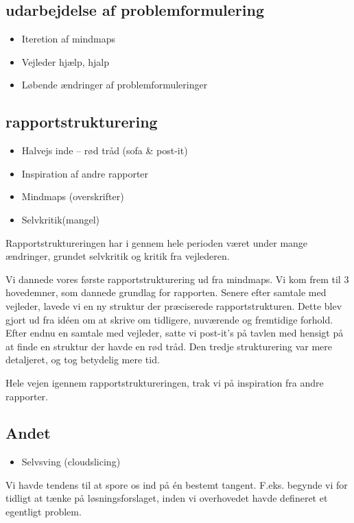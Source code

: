 \subsection{udarbejdelse af problemformulering}
\begin{itemize}
\item Iteretion af mindmaps
\item Vejleder hjælp, hjalp
\item Løbende ændringer af problemformuleringer

\end{itemize}

\subsection{rapportstrukturering}
\begin{itemize}
\item Halvejs inde – rød tråd (sofa \& post-it)
\item Inspiration af andre rapporter
\item Mindmaps (overskrifter)
\item Selvkritik(mangel)
\end{itemize}

Rapportstruktureringen har i gennem hele perioden været under mange ændringer, grundet selvkritik og kritik fra vejlederen.

Vi dannede vores første rapportstrukturering ud fra mindmaps. Vi kom frem til 3 hovedemner, som dannede grundlag for rapporten. Senere efter samtale med vejleder, lavede vi en ny struktur der præciserede rapportstrukturen. Dette blev gjort ud fra idéen om at skrive om tidligere, nuværende og fremtidige forhold. Efter endnu en samtale med vejleder, satte vi post-it's på tavlen med hensigt på at finde en struktur der havde en rød tråd. Den tredje strukturering var mere detaljeret, og tog betydelig mere tid.

Hele vejen igennem rapportstruktureringen, trak vi på inspiration fra andre rapporter.

\subsection{Andet}
\begin{itemize}

\item Selvsving (cloudslicing) 
\end{itemize}

Vi havde tendens til at spore os ind på én bestemt tangent. F.eks. begynde vi for tidligt at tænke på løsningsforslaget, inden vi overhovedet havde defineret et egentligt problem.



